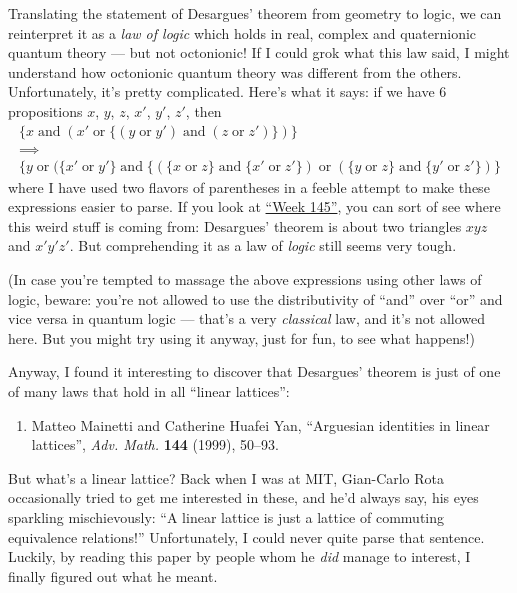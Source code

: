 \documentclass{article}
\def\tightlist{}
\begin{document}
Translating the statement of Desargues' theorem from geometry to logic,
we can reinterpret it as a \emph{law of logic} which holds in real,
complex and quaternionic quantum theory --- but not octonionic! If I
could grok what this law said, I might understand how octonionic quantum
theory was different from the others. Unfortunately, it's pretty
complicated. Here's what it says: if we have 6 propositions \(x\),
\(y\), \(z\), \(x'\), \(y'\), \(z'\), then \[
  \begin{gathered}
    \{x \operatorname{and} (x' \operatorname{or} \{(y \operatorname{or} y') \operatorname{and} (z \operatorname{or} z')\})\}
  \\\implies
  \\\{y \operatorname{or} (\{x' \operatorname{or} y'\} \operatorname{and} \{(\{x \operatorname{or} z\} \operatorname{and} \{x' \operatorname{or} z'\}) \operatorname{or} (\{y \operatorname{or} z\} \operatorname{and} \{y' \operatorname{or} z'\}) \}
  \end{gathered}
\] where I have used two flavors of parentheses in a feeble attempt to
make these expressions easier to parse. If you look at
\protect\hyperlink{week145}{``Week 145''}, you can sort of see where
this weird stuff is coming from: Desargues' theorem is about two
triangles \(xyz\) and \(x'y'z'\). But comprehending it as a law of
\emph{logic} still seems very tough.

(In case you're tempted to massage the above expressions using other
laws of logic, beware: you're not allowed to use the distributivity of
``and'' over ``or'' and vice versa in quantum logic --- that's a very
\emph{classical} law, and it's not allowed here. But you might try using
it anyway, just for fun, to see what happens!)

Anyway, I found it interesting to discover that Desargues' theorem is
just of one of many laws that hold in all ``linear lattices'':

\begin{enumerate}
\def\labelenumi{\arabic{enumi})}
\setcounter{enumi}{2}
\tightlist
\item
  Matteo Mainetti and Catherine Huafei Yan, ``Arguesian identities in
  linear lattices'', \emph{Adv. Math.} \textbf{144} (1999), 50--93.
\end{enumerate}

But what's a linear lattice? Back when I was at MIT, Gian-Carlo Rota
occasionally tried to get me interested in these, and he'd always say,
his eyes sparkling mischievously: ``A linear lattice is just a lattice
of commuting equivalence relations!'' Unfortunately, I could never quite
parse that sentence. Luckily, by reading this paper by people whom he
\emph{did} manage to interest, I finally figured out what he meant.
\end{document}

